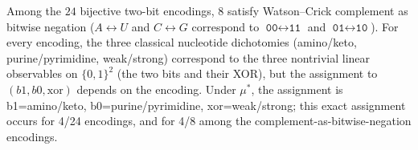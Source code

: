 Among the $24$ bijective two-bit encodings, 8 satisfy Watson--Crick complement as bitwise negation ($A\leftrightarrow U$ and $C\leftrightarrow G$ correspond to $\texttt{00}\leftrightarrow\texttt{11}$ and $\texttt{01}\leftrightarrow\texttt{10}$). For every encoding, the three classical nucleotide dichotomies (amino/keto, purine/pyrimidine, weak/strong) correspond to the three nontrivial linear observables on $\{0,1\}^2$ (the two bits and their XOR), but the assignment to $(b1,b0,\mathrm{xor})$ depends on the encoding. Under $\mu^\ast$, the assignment is b1=amino/keto, b0=purine/pyrimidine, xor=weak/strong; this exact assignment occurs for 4/24 encodings, and for 4/8 among the complement-as-bitwise-negation encodings.

